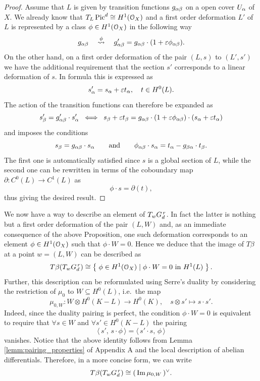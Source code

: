 	\begin{proof}
		Assume that $L$ is given by transition functions $g_{\alpha\beta}$ on a open cover $U_\alpha$ of $X$. We already know that $T_L \operatorname{Pic}^d \cong H^1(\mathcal{O}_X)$ and a first order deformation $L'$ of $L$ is represented by a class $\phi \in H^1(\mathcal{O}_X)$ in the following way
		$$ g_{\alpha\beta} \quad\overset{\phi}\leadsto\quad g'_{\alpha\beta} = g_{\alpha\beta} \cdot (1+ \varepsilon \phi_{\alpha\beta}). $$  
		On the other hand, on a first order deformation of the pair $(L,s)$ to $(L',s')$ we have the additional requirement that the section $s'$ corresponds to a linear deformation of $s$. In formula this is expressed as
		$$ s'_\alpha = s_\alpha + \varepsilon t_\alpha, \quad t \in H^0(L). $$
		The action of the transition functions can therefore be expanded as
		$$ s'_\beta = g'_{\alpha\beta} \cdot s'_\alpha \;\iff\; s_\beta + \varepsilon t_\beta = g_{\alpha\beta} \cdot (1 + \varepsilon \phi_{\alpha\beta})\cdot(s_\alpha + \varepsilon t_\alpha)$$
		and imposes the conditions
		$$ s_\beta = g_{\alpha\beta} \cdot s_\alpha \qquad \text{and} \qquad \phi_{\alpha\beta} \cdot s_\alpha = t_\alpha - g_{\beta\alpha}\cdot t_\beta. $$
		The first one is automatically satisfied since $s$ is a global section of $L$, while the second one can be rewritten in terms of the coboundary map $\partial : C^0(L) \to C^1(L)$ as
		$$ \phi \cdot s = \partial (t), $$
		thus giving the desired result.
	\end{proof}
	We now have a way to describe an element of $T_wG_d^{\,r}$. In fact the latter is nothing but a first order deformation of the pair $(L,W)$ and, as an immediate consequence of the above Proposition, one such deformation corresponds to an element $\phi\in H^1(\mathcal{O}_X)$ such that $\phi\cdot W = 0$. Hence we deduce that the image of $T\beta$ at a point $w=(L,W)$ can be described as
	\begin{equation*}
		T\beta(T_w G_d^{\,r}) \cong \left\{\;  \phi \in H^1(\mathcal{O}_X) \mid \phi\cdot W = 0 \text{ in } H^1(L)  \; \right\}.
	\end{equation*}
	Further, this description can be reformulated using Serre's duality by considering the restriction of $\mu_0$ to $W\subseteq H^0(L)$, i.e.\ the map
	$$ \mu_{0,W} : W\otimes H^0(K-L) \to H^0(K), \quad s\otimes s' \mapsto s\cdot s'. $$
	Indeed, since the duality pairing is perfect, the condition $\phi\cdot W = 0$ is equivalent to require that $\forall s\in W$ and $\forall s'\in H^0(K-L)$ the pairing
	$$ \langle\, s',\, s\cdot \phi \, \rangle = \langle \,s'\cdot s,\, \phi \,\rangle $$
	vanishes. Notice that the above identity follows from Lemma \ref{lemm:pairing_properties} of Appendix A and the local description of abelian differentials. Therefore, in a more concise form, we can write 
	\begin{equation}\label{eq:im_beta_*}
		T\beta(T_w G_d^{\,r})\cong(\,\operatorname{Im} \mu_{0,W}\,)^{\vee}.
	\end{equation}

